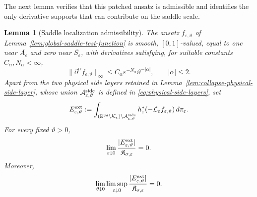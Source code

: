 \documentclass[11pt]{article}
\numberwithin{equation}{section}
\theoremstyle{plain}
\newtheorem{lemma}[theorem]{Lemma}
\theoremstyle{definition}
\theoremstyle{remark}
\newcommand{\R}{\mathbb R}
\newcommand{\eps}{\varepsilon}
\newcommand{\calL}{\mathcal L}
\begin{document}
The next lemma verifies that this patched ansatz is admissible
and identifies the only derivative supports that can contribute on the saddle
scale.

\begin{lemma}[Saddle localization admissibility]
\label{lem:saddle-localization-admissibility}
The ansatz $f_{\eps,\vartheta}$ of
Lemma~\ref{lem:global-saddle-test-function} is smooth, $[0,1]$-valued, equal
to one near $\overline{A_\eps}$ and zero near $\overline{S_\eps}$, with
derivatives satisfying, for suitable constants $C_\alpha,N_\alpha<\infty$,
\begin{equation}
\label{eq:global-saddle-derivative-bound}
\|\partial^\alpha f_{\eps,\vartheta}\|_\infty
\le C_\alpha\eps^{-N_\alpha}\vartheta^{-|\alpha|},
\qquad |\alpha|\le2.
\end{equation}
Apart
from the two physical side layers retained in
Lemma~\ref{lem:collapse-physical-side-layer}, whose union
$\mathcal A_{\eps,\vartheta}^{\rm side}$ is defined in
\eqref{eq:physical-side-layers}, set
\[
E_{\eps,\vartheta}^{\rm ext}
:=
\int_{(\R^{3d}\setminus\mathcal K_\eps)
\setminus\mathcal A_{\eps,\vartheta}^{\rm side}}
h_\eps^*(-\calL_\eps f_{\eps,\vartheta})\,d\pi_\eps.
\]
For every fixed $\vartheta>0$,
\begin{equation}
\label{eq:saddle-localization-fixed-theta}
\lim_{\eps\downarrow0}
\frac{|E_{\eps,\vartheta}^{\rm ext}|}{\mathfrak K_{\sigma,\eps}}=0.
\end{equation}
Moreover,
\begin{equation}
\label{eq:saddle-localization-ordered-limit}
\lim_{\vartheta\downarrow0}\limsup_{\eps\downarrow0}
\frac{|E_{\eps,\vartheta}^{\rm ext}|}{\mathfrak K_{\sigma,\eps}}=0.
\end{equation}
\end{lemma}
\end{document}
